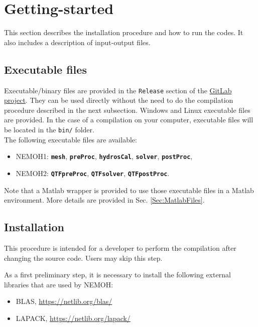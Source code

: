 \documentclass[12pt,a4paper,titlepage]{article}
\begin{document}
\section{Getting-started} \label{Sec:Getstarted}
This section describes the installation procedure and how to run the codes. It also includes a description of input-output files.


\subsection{Executable files}\label{Sec:Execute}
Executable/binary files are provided in the \texttt{Release} section of the \href{https://gitlab.com/lheea/Nemoh}{GitLab project}. They can be used directly without the need to do the compilation procedure described in the next subsection. Windows and Linux executable files are provided. In the case of a compilation on your computer, executable files will be located in the \texttt{bin/} folder. \\

\noindent
The following executable files are available:
\begin{itemize}
\item NEMOH1: \texttt{\textbf{mesh}}, \texttt{\textbf{preProc}}, \texttt{\textbf{hydrosCal}}, \texttt{\textbf{solver}}, \texttt{\textbf{postProc}},
\item NEMOH2: \texttt{\textbf{QTFpreProc}}, \texttt{\textbf{QTFsolver}}, \texttt{\textbf{QTFpostProc}}.
\end{itemize}

Note that a Matlab wrapper is provided to use those executable files in a Matlab environment. More details are provided in Sec. \ref{Sec:MatlabFiles}.

\subsection{Installation}
This procedure is intended for a developer to perform the compilation after changing the source code. Users may skip this step.

As a first preliminary step, it is necessary to install the following external libraries that are used by NEMOH:
\begin{itemize}
    \item BLAS, \url{https://netlib.org/blas/}
    \item LAPACK, \url{https://netlib.org/lapack/}
\end{itemize}
\end{document}
